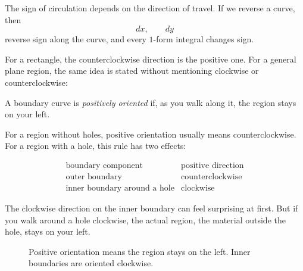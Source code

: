 The sign of circulation depends on the direction of travel.  If we reverse a curve,
then
\[
    dx,
    \qquad dy
\]
reverse sign along the curve, and every \(1\)-form integral changes sign.

For a rectangle, the counterclockwise direction is the positive one.  For a general plane
region, the same idea is stated without mentioning clockwise or counterclockwise:

\begin{definition}
A boundary curve is \emph{positively oriented} if, as you walk along it, the region stays
on your left.
\end{definition}

For a region without holes, positive orientation usually means counterclockwise.
For a region with a hole, this rule has two effects:

\[
\begin{array}{c|c}
\text{boundary component} & \text{positive direction} \\ \hline
\text{outer boundary} & \text{counterclockwise}\\[1mm]
\text{inner boundary around a hole} & \text{clockwise}
\end{array}
\]

The clockwise direction on the inner boundary can feel surprising at first.  But if you
walk around a hole clockwise, the actual region, the material outside the hole, stays on
your left.

\begin{figure}[h]
\centering
{}
\caption{Positive orientation means the region stays on the left.  Inner boundaries are
oriented clockwise.}
\end{figure}

